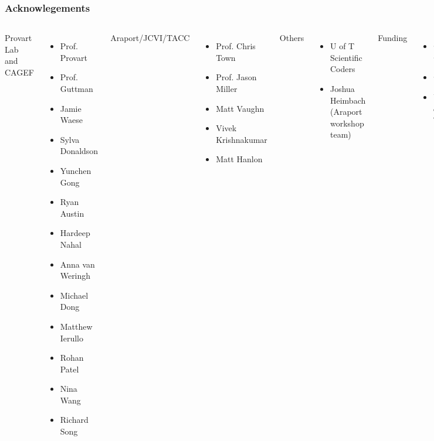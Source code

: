 \documentclass{beamer}
\begin{document}
	\begin{frame}
		\frametitle{Acknowlegements}
		\begin{columns}[c]
			Provart Lab and CAGEF
			\begin{itemize}
				\item Prof. Provart
				\item Prof. Guttman
				\item Jamie Waese
				\item Sylva Donaldson
				\item Yunchen Gong
				\item Ryan Austin
				\item Hardeep Nahal
				\item Anna van Weringh
				\item Michael Dong
				\item Matthew Ierullo
				\item Rohan Patel
				\item Nina Wang
				\item Richard Song
			\end{itemize}

			Araport/JCVI/TACC
			\begin{itemize}
				\item Prof. Chris Town
				\item Prof. Jason Miller
				\item Matt Vaughn
				\item Vivek Krishnakumar
				\item Matt Hanlon
			\end{itemize}
			Others
			\begin{itemize}
				\item U of T Scientific Coders
				\item Joshua Heimbach (Araport workshop team)
			\end{itemize}
			Funding
			\begin{itemize}
				\item Genome Canada
				\item CAGEF
				\item University of Toronto
			\end{itemize}
		\end{columns}
	\end{frame}
\end{document}
